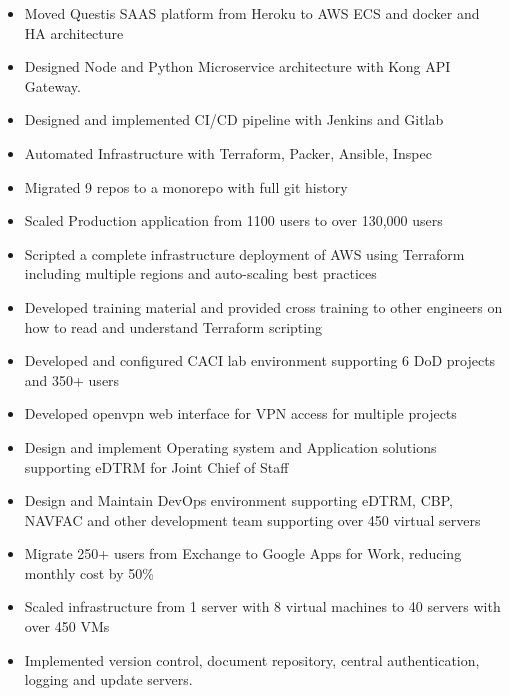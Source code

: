 \documentclass[10pt,a4paper,roman]{moderncv} %
\begin{document}
{
\begin{itemize}
\item Moved Questis SAAS platform from Heroku to AWS ECS and docker and HA architecture
\item Designed Node and Python Microservice architecture with Kong API Gateway.
\item Designed and implemented CI/CD pipeline with Jenkins and Gitlab
\item Automated Infrastructure with Terraform, Packer, Ansible, Inspec
\item Migrated 9 repos to a monorepo with full git history
\item Scaled Production application from 1100 users to over 130,000 users
\end{itemize}}

{
\begin{itemize}
\item Scripted a complete infrastructure deployment of AWS using Terraform including multiple regions and auto-scaling best practices
\item Developed training material and provided cross training to other engineers on how to read and understand Terraform scripting
\item Developed and configured CACI lab environment supporting 6 DoD projects and 350+ users
\item Developed openvpn web interface for VPN access for multiple projects
\end{itemize}}

{
\begin{itemize}
\item Design and implement Operating system and Application solutions supporting eDTRM for Joint Chief of Staff
\item Design and Maintain DevOps environment supporting eDTRM, CBP, NAVFAC and other development team supporting over 450 virtual servers
\item Migrate 250+ users from Exchange to Google Apps for Work, reducing monthly cost by 50\%
\item Scaled infrastructure from 1 server with 8 virtual machines to 40 servers with over 450 VMs
\item Implemented version control, document repository, central authentication, logging and update servers.   
\end{itemize}}
\end{document}
